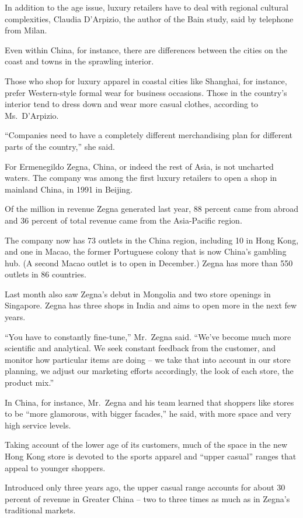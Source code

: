 ﻿\documentclass[12pt]{article}
\begin{document}
In addition to the age issue, luxury retailers have to deal with regional cultural complexities,
Claudia D'Arpizio, the author of the Bain study, said by telephone from Milan.

Even within China, for instance, there are differences between the cities on the coast and towns in
the sprawling interior.

Those who shop for luxury apparel in coastal cities like Shanghai, for instance, prefer
Western-style formal wear for business occasions. Those in the country's interior tend to dress down
and wear more casual clothes, according to Ms.~D'Arpizio.

``Companies need to have a completely different merchandising plan for different parts of the
country,'' she said.

For Ermenegildo Zegna, China, or indeed the rest of Asia, is not uncharted waters. The company was
among the first luxury retailers to open a shop in mainland China, in 1991 in Beijing.

Of the  million in revenue Zegna generated last year, 88 percent came from abroad and
36 percent of total revenue came from the Asia-Pacific region.

The company now has 73 outlets in the China region, including 10 in Hong Kong, and one in Macao, the
former Portuguese colony that is now China's gambling hub. (A second Macao outlet is to open in
December.) Zegna has more than 550 outlets in 86 countries.

Last month also saw Zegna's debut in Mongolia and two store openings in Singapore. Zegna has three
shops in India and aims to open more in the next few years.

``You have to constantly fine-tune,'' Mr.~Zegna said. ``We've become much more scientific and
analytical. We seek constant feedback from the customer, and monitor how particular items are doing
-- we take that into account in our store planning, we adjust our marketing efforts accordingly, the
look of each store, the product mix.''

In China, for instance, Mr.~Zegna and his team learned that shoppers like stores to be ``more
glamorous, with bigger facades,'' he said, with more space and very high service levels.

Taking account of the lower age of its customers, much of the space in the new Hong Kong store is
devoted to the sports apparel and ``upper casual'' ranges that appeal to younger shoppers.

Introduced only three years ago, the upper casual range accounts for about 30 percent of revenue in
Greater China -- two to three times as much as in Zegna's traditional markets.
\end{document}

